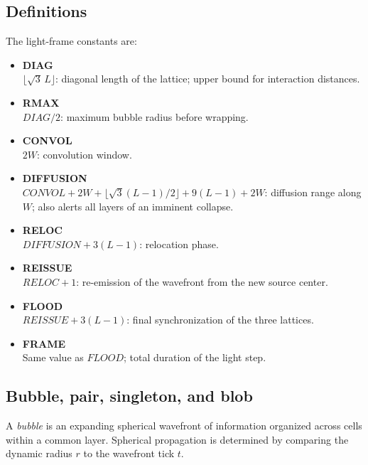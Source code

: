 \documentclass{ijuc}
\begin{document}
\subsection{Definitions\label{subsec:Definitions}}

The light-frame constants are:

\begin{itemize}
\item \textbf{DIAG}\\
$\lfloor\sqrt{3}\,L\rfloor$: diagonal length of the lattice; upper bound for interaction distances.

\item \textbf{RMAX}\\
$DIAG/2$: maximum bubble radius before wrapping.

\item \textbf{CONVOL}\\
$2W$: convolution window.

\item \textbf{DIFFUSION} \\
$CONVOL + 2W + \lfloor\sqrt{3}(L-1)/2\rfloor + 9(L-1) + 2W$: diffusion range along $W$; also alerts all layers of an imminent collapse.

\item \textbf{RELOC}\\
$DIFFUSION + 3(L-1)$: relocation phase.

\item \textbf{REISSUE}\\
$RELOC + 1$: re-emission of the wavefront from the new source center.

\item \textbf{FLOOD}\\
$REISSUE + 3(L-1)$: final synchronization of the three lattices.

\item \textbf{FRAME}\\
Same value as $FLOOD$; total duration of the light step.

\end{itemize}

\subsection{Bubble, pair, singleton, and blob} \label{subsec:pairs}

A \emph{bubble} is an expanding spherical wavefront of information organized across cells within a common layer. Spherical propagation is determined by comparing the dynamic radius $r$ to the wavefront tick $t$. 
\end{document}
